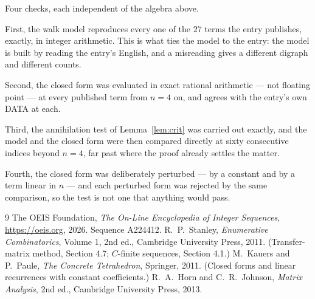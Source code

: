 \documentclass[11pt,a4paper]{article}
\theoremstyle{plain}
\theoremstyle{definition}
\begin{document}
Four checks, each independent of the algebra above.

First, the walk model reproduces every one of the $27$ terms the entry publishes,
exactly, in integer arithmetic. This is what ties the model to the entry: the model is built
by reading the entry's English, and a misreading gives a different digraph and different
counts.

Second, the closed form was evaluated in exact rational arithmetic --- not floating point ---
at every published term from $n=4$ on, and agrees with the entry's own DATA at each.

Third, the annihilation test of Lemma~\ref{lem:crit} was carried out exactly, and the model
and the closed form were then compared directly at sixty consecutive indices beyond
$n=4$, far past where the proof already settles the matter.

Fourth, the closed form was deliberately perturbed --- by a constant and by a term linear in
$n$ --- and each perturbed form was rejected by the same comparison, so the test is not one
that anything would pass.

\begin{thebibliography}{9}
 The OEIS Foundation, \emph{The On-Line Encyclopedia of Integer
Sequences}, \url{https://oeis.org}, 2026. Sequence A224412.
 R.~P.~Stanley, \emph{Enumerative Combinatorics}, Volume 1, 2nd ed.,
Cambridge University Press, 2011. (Transfer-matrix method, Section 4.7; $C$-finite sequences,
Section 4.1.)
 M.~Kauers and P.~Paule, \emph{The Concrete Tetrahedron}, Springer, 2011.
(Closed forms and linear recurrences with constant coefficients.)
 R.~A.~Horn and C.~R.~Johnson, \emph{Matrix Analysis}, 2nd ed., Cambridge
University Press, 2013.
\end{thebibliography}
\end{document}
